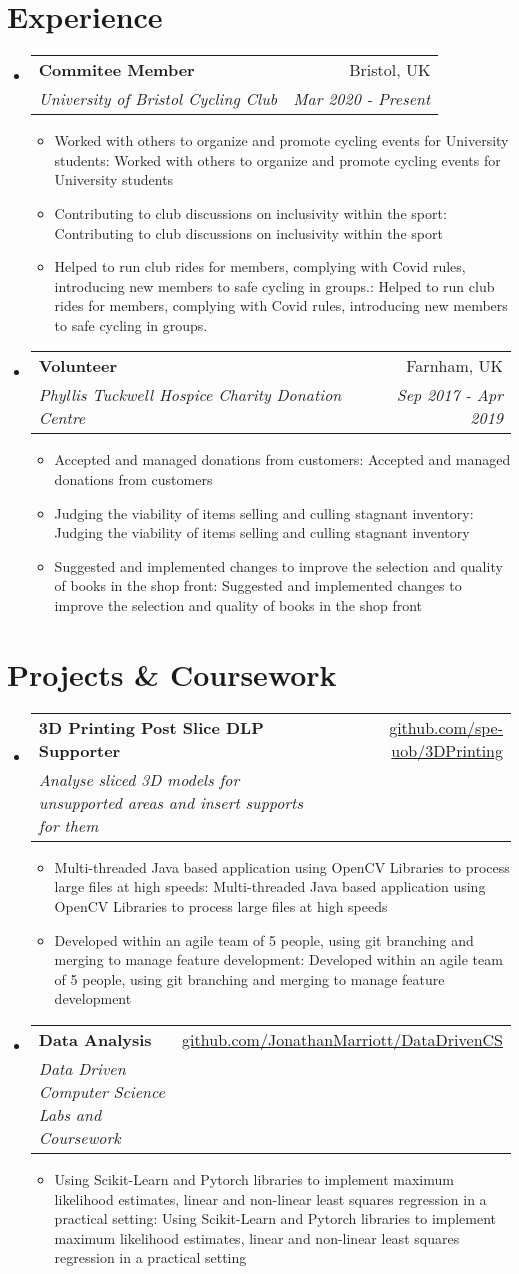 \documentclass[a4paper,11pt]{article}
\makeatletter
\def \ifempty#1{\def\temp{#1} \ifx\temp\empty }
\newcommand{\resumeItem}[2]{
  \item\small{
  	\ifempty{#1}#2\else\textbf{#1}{: #2 \vspace{-2pt}}\fi
  }
}
\newcommand{\resumeSubheading}[4]{
  \vspace{-1pt}\item
    \begin{tabular*}{0.97\textwidth}{l@{\extracolsep{\fill}}r}
      \textbf{#1} & #2 \\
      \textit{\small#3} & \textit{\small #4} \\
    \end{tabular*}\vspace{-5pt}
}
\newcommand{\resumeSubHeadingListStart}{\begin{itemize}[leftmargin=*]}
\newcommand{\resumeSubHeadingListEnd}{\end{itemize}}
\newcommand{\resumeItemListStart}{\begin{itemize}}
\newcommand{\resumeItemListEnd}{\end{itemize}\vspace{-5pt}}
\makeatother
\begin{document}
\section{Experience}
  \resumeSubHeadingListStart
\resumeSubheading
      {Commitee Member}{Bristol, UK}
      {University of Bristol Cycling Club}{Mar 2020 - Present}
      \resumeItemListStart
      	\resumeItem{}
          {Worked with others to organize and promote cycling events for University students}
        \resumeItem{}  
          {Contributing to club discussions on inclusivity within the sport}
	\resumeItem{}  
          {Helped to run club rides for members, complying with Covid rules, introducing new members to safe cycling in groups.}
      \resumeItemListEnd
    \resumeSubheading
      {Volunteer}{Farnham, UK}
      {Phyllis Tuckwell Hospice Charity Donation Centre}{Sep 2017 - Apr 2019}
      \resumeItemListStart
      	\resumeItem{}
          {Accepted and managed donations from customers}
        \resumeItem{}
          {Judging the viability of items selling and culling stagnant inventory}
        \resumeItem{}
          {Suggested and implemented changes to improve the selection and quality of books in the shop front}
      \resumeItemListEnd
  \resumeSubHeadingListEnd



\section{Projects \& Coursework}
  \resumeSubHeadingListStart
    \resumeSubheading
      {3D Printing Post Slice DLP Supporter}{\href{https://github.com/spe-uob/3DPrinting}
      {github.com/spe-uob/3DPrinting}}
      { Analyse sliced 3D models for unsupported areas and insert supports for them}{}
      \resumeItemListStart
        \resumeItem{}
          {Multi-threaded Java based application using OpenCV Libraries to process large files at high speeds}
	\resumeItem{}
	{Developed within an agile team of 5 people, using git branching and merging to manage feature development}
      \resumeItemListEnd
    \resumeSubheading
      {Data Analysis}{\href{https://github.com/JonathanMarriott/DataDrivenCS}{github.com/JonathanMarriott/DataDrivenCS}}
      {Data Driven Computer Science Labs and Coursework}{}
      \resumeItemListStart
        \resumeItem{}
          {Using Scikit-Learn and Pytorch libraries to implement maximum likelihood estimates, linear and non-linear least squares regression in a practical setting}
      \resumeItemListEnd
  \resumeSubHeadingListEnd
\end{document}
